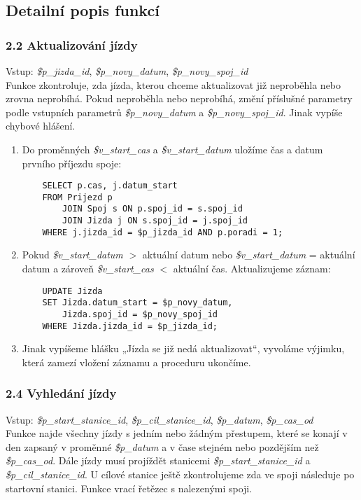 \documentclass[11pt]{article}
\begin{document}
\subsection{Detailní popis funkcí}


\subsubsection*{2.2 Aktualizování jízdy}
Vstup: \textit{\$p\_jizda\_id}, \textit{\$p\_novy\_datum}, \textit{\$p\_novy\_spoj\_id}\\
Funkce zkontroluje, zda jízda, kterou chceme aktualizovat již neproběhla nebo zrovna neprobíhá. Pokud neproběhla nebo neprobíhá, změní příslušné parametry podle vstupních parametrů \textit{\$p\_novy\_datum} a \textit{\$p\_novy\_spoj\_id}. Jinak vypíše chybové hlášení.

\begin{enumerate}
    \item Do proměnných \textit{\$v\_start\_cas} a \textit{\$v\_start\_datum} uložíme čas a datum prvního příjezdu spoje:
    \begin{lstlisting}
    SELECT p.cas, j.datum_start
    FROM Prijezd p
        JOIN Spoj s ON p.spoj_id = s.spoj_id
        JOIN Jizda j ON s.spoj_id = j.spoj_id
    WHERE j.jizda_id = $p_jizda_id AND p.poradi = 1;
    \end{lstlisting}
    
    \item Pokud \textit{\$v\_start\_datum} $>$ aktuální datum nebo \textit{\$v\_start\_datum} = aktuální datum a zároveň \textit{\$v\_start\_cas} $<$ aktuální čas. Aktualizujeme záznam:
    \begin{lstlisting}
    UPDATE Jizda
    SET Jizda.datum_start = $p_novy_datum,
        Jizda.spoj_id = $p_novy_spoj_id
    WHERE Jizda.jizda_id = $p_jizda_id;
    \end{lstlisting}

    \item Jinak vypíšeme hlášku „Jízda se již nedá aktualizovat“, vyvoláme výjimku, která zamezí vložení záznamu a proceduru ukončíme.
\end{enumerate}


\subsubsection*{2.4 Vyhledání jízdy}
Vstup: \textit{\$p\_start\_stanice\_id}, \textit{\$p\_cil\_stanice\_id}, \textit{\$p\_datum}, \textit{\$p\_cas\_od}\\
Funkce najde všechny jízdy s jedním nebo žádným přestupem, které se konají v den zapsaný v proměnné \textit{\$p\_datum} a v čase stejném nebo pozdějším než \textit{\$p\_cas\_od}. Dále jízdy musí projíždět stanicemi \textit{\$p\_start\_stanice\_id} a \textit{\$p\_cil\_stanice\_id}. U cílové stanice ještě zkontrolujeme zda ve spoji následuje po startovní stanici. Funkce vrací řetězec s nalezenými spoji.
\end{document}

